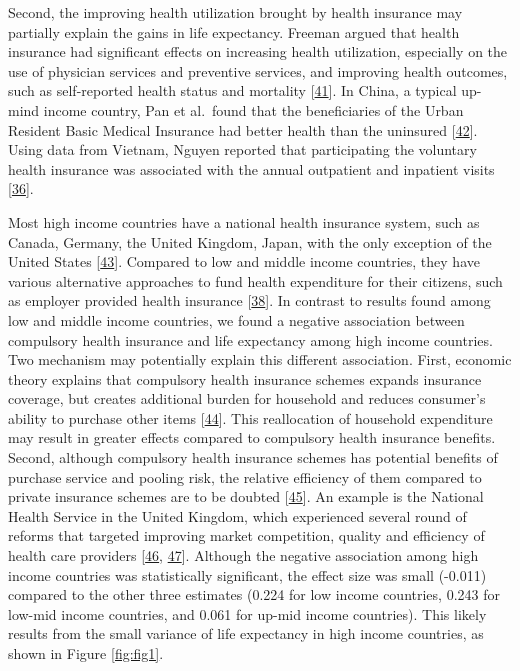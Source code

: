 \documentclass[]{elsarticle} %
\begin{document}
Second, the improving health utilization brought by health insurance may partially explain the gains in life expectancy. Freeman argued that health insurance had significant effects on increasing health utilization, especially on the use of physician services and preventive services, and improving health outcomes, such as self-reported health status and mortality {[}\protect\hyperlink{ref-Freeman2008}{41}{]}. In China, a typical up-mind income country, Pan et al.~found that the beneficiaries of the Urban Resident Basic Medical Insurance had better health than the uninsured {[}\protect\hyperlink{ref-Pan2016}{42}{]}. Using data from Vietnam, Nguyen reported that participating the voluntary health insurance was associated with the annual outpatient and inpatient visits {[}\protect\hyperlink{ref-Nguyen2012}{36}{]}.

Most high income countries have a national health insurance system, such as Canada, Germany, the United Kingdom, Japan, with the only exception of the United States {[}\protect\hyperlink{ref-Emery2010}{43}{]}. Compared to low and middle income countries, they have various alternative approaches to fund health expenditure for their citizens, such as employer provided health insurance {[}\protect\hyperlink{ref-lagomarsino2012moving}{38}{]}. In contrast to results found among low and middle income countries, we found a negative association between compulsory health insurance and life expectancy among high income countries. Two mechanism may potentially explain this different association. First, economic theory explains that compulsory health insurance schemes expands insurance coverage, but creates additional burden for household and reduces consumer's ability to purchase other items {[}\protect\hyperlink{ref-koch2010health}{44}{]}. This reallocation of household expenditure may result in greater effects compared to compulsory health insurance benefits. Second, although compulsory health insurance schemes has potential benefits of purchase service and pooling risk, the relative efficiency of them compared to private insurance schemes are to be doubted {[}\protect\hyperlink{ref-savedoff2012political}{45}{]}. An example is the National Health Service in the United Kingdom, which experienced several round of reforms that targeted improving market competition, quality and efficiency of health care providers {[}\protect\hyperlink{ref-bevan2011does}{46}, \protect\hyperlink{ref-gaynor2013death}{47}{]}. Although the negative association among high income countries was statistically significant, the effect size was small (-0.011) compared to the other three estimates (0.224 for low income countries, 0.243 for low-mid income countries, and 0.061 for up-mid income countries). This likely results from the small variance of life expectancy in high income countries, as shown in Figure \ref{fig:fig1}.
\end{document}
